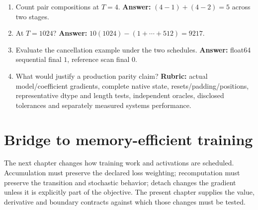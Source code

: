 \begin{enumerate}
\textbf{Answer:} producing coefficients still requires previous recurrent states.
\item Count pair compositions at $T=4$.
\textbf{Answer:} $(4-1)+(4-2)=5$ across two stages.
\item At $T=1024$?
\textbf{Answer:} $10(1024)-(1+\cdots+512)=9217$.
\item Evaluate the cancellation example under the two schedules.
\textbf{Answer:} float64 sequential final $1$, reference scan final $0$.
\item What would justify a production parity claim?
\textbf{Rubric:} actual model/coefficient gradients, complete native state,
resets/padding/positions, representative dtype and length tests, independent
oracles, disclosed tolerances and separately measured systems performance.
\end{enumerate}

\section{Bridge to memory-efficient training}
The next chapter changes how training work and activations are scheduled.
Accumulation must preserve the declared loss weighting; recomputation must preserve
the transition and stochastic behavior; detach changes the gradient unless it is
explicitly part of the objective. The present chapter supplies the value, derivative
and boundary contracts against which those changes must be tested.
